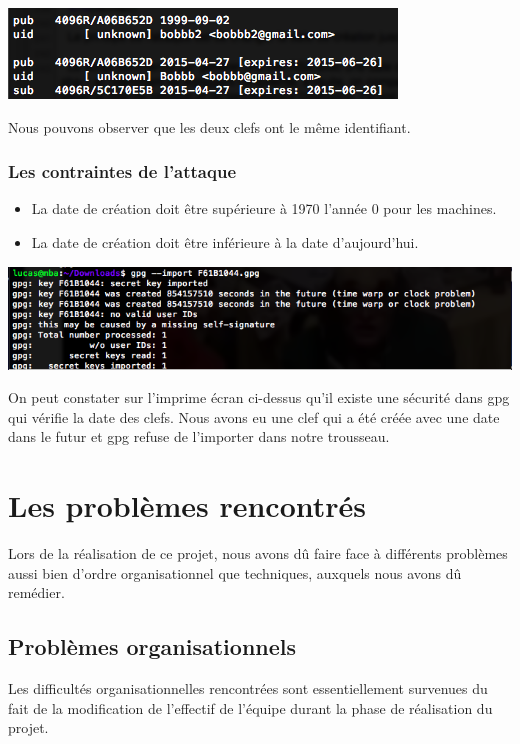 \documentclass{../res/univ-projet}
\begin{document}
  \includegraphics[scale=0.8]{clefs}
  
  Nous pouvons observer que les deux clefs ont le même identifiant.
  
  \subsubsection{Les contraintes de l'attaque}
  
      \begin{itemize}
        \item La date de création doit être supérieure à 1970 l'année 0 pour les machines.
        \item La date de création doit être inférieure à la date d'aujourd'hui.
      \end{itemize}
    \medbreak
    \includegraphics[scale=0.70]{attaque.png}

 On peut constater sur l'imprime écran ci-dessus qu'il existe une sécurité dans gpg qui vérifie la date des clefs. Nous avons eu une clef qui a été créée avec une date dans le futur et gpg refuse de l'importer dans notre trousseau.

\section{Les problèmes rencontrés}

  Lors de la réalisation de ce projet, nous avons dû faire face à
  différents problèmes aussi bien d'ordre organisationnel que techniques,
  auxquels nous avons dû remédier.

  \subsection{Problèmes organisationnels}

    Les difficultés organisationnelles rencontrées sont essentiellement
    survenues du fait de la modification de l'effectif de l'équipe durant la
    phase de réalisation du projet. 
\end{document}
